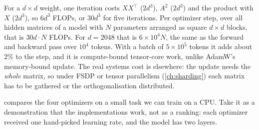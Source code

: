 \begin{napkinmath}
For a $d\times d$ weight, one iteration costs $X X^\top$ ($2d^3$), $A^2$ ($2d^3$) and the product
with $X$ ($2d^3$), so $6d^3$ FLOPs, or $30d^3$ for five iterations. Per optimizer step, over all hidden matrices of a
model with $N$ parameters arranged as square $d\times d$ blocks, that is $30 d\cdot N$ FLOPs.
For $d=2048$ that is $6\times10^4 N$, the same as the forward and backward pass over
$10^4$ tokens. With a batch of $5\times10^5$ tokens it adds about 2\% to the step, and it is
compute-bound tensor-core work, unlike AdamW's memory-bound update. The real systems cost
is elsewhere: the update needs the \emph{whole} matrix, so under FSDP or tensor parallelism
(\cref{ch:sharding}) each matrix has to be gathered or the orthogonalisation distributed.
\end{napkinmath}

 compares the four optimizers on a small task we can train on a CPU.
Take it as a demonstration that the implementations work, not as a ranking: each optimizer
received one hand-picked learning rate, and the model has two layers.

